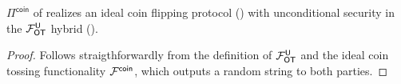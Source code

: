 \begin{lemma}\label{lem:OTtoC}
	$\Pi^{\textsf{coin}}$ of  realizes an ideal coin flipping protocol () with unconditional security  in the $\mathcal{F}_{\mathsf{OT}}^{\mathsf{U}}$ hybrid  ().
\end{lemma}
\begin{proof}
	Follows straigthforwardly from the definition of $\mathcal{F}_{\mathsf{OT}}^{\mathsf{U}}$ and the ideal coin tossing functionality $\mathcal{F}^{\mathsf{coin}}$, which outputs a random string to both parties.
	\pe
\end{proof}







% 

